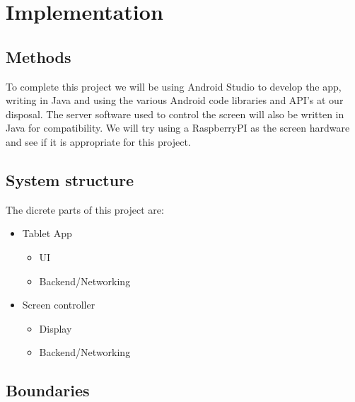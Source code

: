 \documentclass[12pt,a4paper,notitlepage]{report}
\begin{document}
\chapter{Implementation}
\section{Methods}


To complete this project we will be using Android Studio to develop the app, writing in Java and using the various Android code libraries and API's at our disposal. The server software used to control the screen will also be written in Java for compatibility. We will try using a RaspberryPI as the screen hardware and see if it is appropriate for this project.


\section{System structure}

The dicrete parts of this project are:

\begin{itemize}
	\item Tablet App
	\begin{itemize}
		\item UI
		\item Backend/Networking
	\end{itemize}
	\item Screen controller
	\begin{itemize}
		\item Display
		\item Backend/Networking
	\end{itemize}
\end{itemize}

\section{Boundaries}

\end{document}
